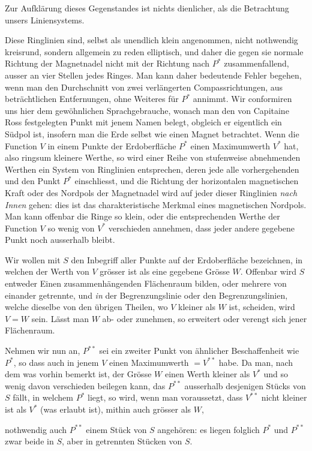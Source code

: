 Zur Aufklärung dieses Gegenstandes ist nichts dienlicher, als die Betrachtung unsers Liniensystems.

\expandafter\def\csname HistoricalNoteText16\endcsname{Diese Ringlinien sind, selbst als unendlich klein angenommen, nicht nothwendig kreisrund, sondern allgemein zu reden elliptisch, und daher die gegen sie normale Richtung der Magnetnadel nicht mit der Richtung nach $P^*$ zusammenfallend, ausser an vier Stellen jedes Ringes. Man kann daher bedeutende Fehler begehen, wenn man den Durchschnitt von zwei verlängerten Compassrichtungen, aus beträchtlichen Entfernungen, ohne Weiteres für $P^*$ annimmt.}
\expandafter\def\csname HistoricalNoteText17\endcsname{Wir conformiren uns hier dem gewöhnlichen Sprachgebrauche, wonach man den von Capitaine Ross festgelegten Punkt mit jenem Namen belegt, obgleich er eigentlich ein Südpol ist, insofern man die Erde selbst wie einen Magnet betrachtet.}
Wenn die Function $V$ in einem Punkte der Erdoberfläche $P^*$ einen Maximumwerth $V^*$ hat, also ringsum kleinere Werthe, so wird einer Reihe von stufenweise abnehmenden Werthen ein System von Ringlinien entsprechen, deren jede alle vorhergehenden und den Punkt $P^*$ einschliesst, und die Richtung der horizontalen magnetischen Kraft oder des Nordpols der Magnetnadel wird auf jeder dieser Ringlinien \textit{nach Innen} gehen: dies ist das charakteristische Merkmal eines magnetischen Nordpols{\renewcommand{\thefootnote}{**)}}. Man kann offenbar die Ringe so klein, oder die entsprechenden Werthe der Function $V$ so wenig von $V^*$ verschieden annehmen, dass jeder andere gegebene Punkt noch ausserhalb bleibt.

Wir wollen mit $S$ den Inbegriff aller Punkte auf der Erdoberfläche bezeichnen, in welchen der Werth von $V$ grösser ist als eine gegebene Grösse $W$. Offenbar wird $S$ entweder Einen zusammenhängenden Flächenraum bilden, oder mehrere von einander getrennte, und \textit{in} der Begrenzungslinie oder den Begrenzungslinien, welche dieselbe von den übrigen Theilen, wo $V$ kleiner als $W$ ist, scheiden, wird $V=W$ sein. Lässt man $W$ ab- oder zunehmen, so erweitert oder verengt sich jener Flächenraum.

Nehmen wir nun an, $P^{**}$ sei ein zweiter Punkt von ähnlicher Beschaffenheit wie $P^*$, so dass auch in jenem $V$ einen Maximumwerth $=V^{**}$ habe. Da man, nach dem was vorhin bemerkt ist, der Grösse $W$ einen Werth kleiner als $V^*$ und so wenig davon verschieden beilegen kann, das $P^{**}$ ausserhalb desjenigen Stücks von $S$ fällt, in welchem $P^*$ liegt, so wird, wenn man voraussetzt, dass $V^{**}$ nicht kleiner ist als $V^*$ (was erlaubt ist), mithin auch grösser als $W$,
\par\clearpage
{}
\noindent nothwendig auch $P^{**}$ einem Stück von $S$ angehören: es liegen folglich $P^*$ und $P^{**}$ zwar beide in $S$, aber in getrennten Stücken von $S$.

